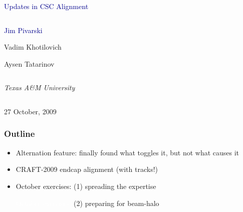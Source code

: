 \documentclass[compress]{beamer}
\begin{document}
\begin{frame}
\vfill
\begin{center}
\textcolor{darkblue}{\Large Updates in CSC Alignment}

\vfill
\begin{columns}
\begin{center}
\large
\textcolor{darkblue}{Jim Pivarski}

\vspace{0.2 cm}
Vadim Khotilovich

\vspace{0.2 cm}
Aysen Tatarinov

\end{center}
\end{columns}

\begin{columns}
\begin{center}
\scriptsize
{\it Texas A\&M University}
\end{center}
\end{columns}

\vfill
27 October, 2009

\end{center}
\end{frame}


\small

\begin{frame}
\frametitle{Outline}
\begin{itemize}\setlength{\itemsep}{1 cm}
\item Alternation feature: finally found what toggles it, but not what causes it

\item CRAFT-2009 endcap alignment (with tracks!)

\item October exercises: (1) spreading the expertise

\textcolor{white}{October exercises:} (2) preparing for beam-halo
\end{itemize}
\end{frame}
\end{document}
